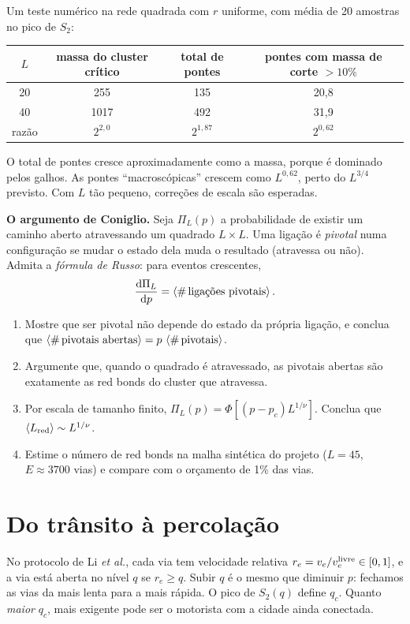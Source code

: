 \documentclass[11pt]{article}
\begin{document}
Um teste numérico na rede quadrada com $r$ uniforme, com média de 20 amostras no pico de $S_2$:
\begin{center}
\begin{tabular}{cccc}
\toprule
$L$ & massa do cluster crítico & total de pontes & pontes com massa de corte $>10\%$ \\
\midrule
20 & 255 & 135 & 20,8 \\
40 & 1017 & 492 & 31,9 \\
razão & $2^{2{,}0}$ & $2^{1{,}87}$ & $2^{0{,}62}$ \\
\bottomrule
\end{tabular}
\end{center}
O total de pontes cresce aproximadamente como a massa, porque é dominado pelos galhos. As pontes ``macroscópicas'' crescem como $L^{0{,}62}$, perto do $L^{3/4}$ previsto. Com $L$ tão pequeno, correções de escala são esperadas.

 \textbf{O argumento de Coniglio.} Seja $\Pi_L(p)$ a probabilidade de existir um caminho aberto atravessando um quadrado $L\times L$. Uma ligação é \emph{pivotal} numa configuração se mudar o estado dela muda o resultado (atravessa ou não). Admita a \emph{fórmula de Russo}: para eventos crescentes,
\[
\frac{\mathrm{d}\Pi_L}{\mathrm{d} p} = \left\langle \#\,\text{ligações pivotais} \right\rangle.
\]
\begin{enumerate}
  \item Mostre que ser pivotal não depende do estado da própria ligação, e conclua que $\left\langle \#\,\text{pivotais abertas} \right\rangle = p\,\left\langle \#\,\text{pivotais} \right\rangle$.
  \item Argumente que, quando o quadrado é atravessado, as pivotais abertas são exatamente as red bonds do cluster que atravessa.
  \item Por escala de tamanho finito, $\Pi_L(p) = \Phi\!\left[(p-p_c)L^{1/\nu}\right]$. Conclua que $\left\langle L_{\rm red} \right\rangle\sim L^{1/\nu}$.
  \item Estime o número de red bonds na malha sintética do projeto ($L=45$, $E\approx 3700$ vias) e compare com o orçamento de 1\% das vias.
\end{enumerate}

\section{Do trânsito à percolação}

No protocolo de Li \emph{et al.}, cada via tem velocidade relativa $r_e = v_e/v_e^{\rm livre}\in[0,1]$, e a via está aberta no nível $q$ se $r_e\ge q$. Subir $q$ é o mesmo que diminuir $p$: fechamos as vias da mais lenta para a mais rápida. O pico de $S_2(q)$ define $q_c$. Quanto \emph{maior} $q_c$, mais exigente pode ser o motorista com a cidade ainda conectada.
\end{document}
